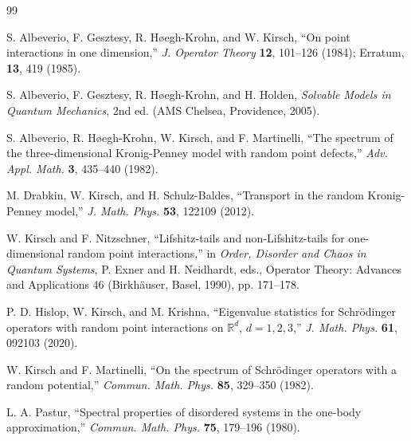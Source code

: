 \documentclass[12pt,a4paper]{article}
\numberwithin{equation}{section}
\begin{document}
\begingroup\small
\begin{thebibliography}{99}

S. Albeverio, F. Gesztesy, R. H\o egh-Krohn, and W. Kirsch,
``On point interactions in one dimension,''
\textit{J. Operator Theory} {\bfseries 12}, 101--126 (1984); Erratum,
{\bfseries 13}, 419 (1985).

S. Albeverio, F. Gesztesy, R. H\o egh-Krohn, and H. Holden,
\textit{Solvable Models in Quantum Mechanics}, 2nd ed.
(AMS Chelsea, Providence, 2005).

S. Albeverio, R. H\o egh-Krohn, W. Kirsch, and F. Martinelli,
``The spectrum of the three-dimensional Kronig-Penney model with random
point defects,''
\textit{Adv. Appl. Math.} {\bfseries 3}, 435--440 (1982).

M. Drabkin, W. Kirsch, and H. Schulz-Baldes,
``Transport in the random Kronig-Penney model,''
\textit{J. Math. Phys.} {\bfseries 53}, 122109 (2012).

W. Kirsch and F. Nitzschner,
``Lifshitz-tails and non-Lifshitz-tails for one-dimensional random point
interactions,''
in \textit{Order, Disorder and Chaos in Quantum Systems},
P. Exner and H. Neidhardt, eds.,
Operator Theory: Advances and Applications 46
(Birkh\"auser, Basel, 1990), pp. 171--178.

P. D. Hislop, W. Kirsch, and M. Krishna,
``Eigenvalue statistics for Schr\"odinger operators with random point
interactions on $\mathbb R^d$, $d=1,2,3$,''
\textit{J. Math. Phys.} {\bfseries 61}, 092103 (2020).

W. Kirsch and F. Martinelli,
``On the spectrum of Schr\"odinger operators with a random potential,''
\textit{Commun. Math. Phys.} {\bfseries 85}, 329--350 (1982).

L. A. Pastur,
``Spectral properties of disordered systems in the one-body approximation,''
\textit{Commun. Math. Phys.} {\bfseries 75}, 179--196 (1980).


\end{thebibliography}
\end{document}
